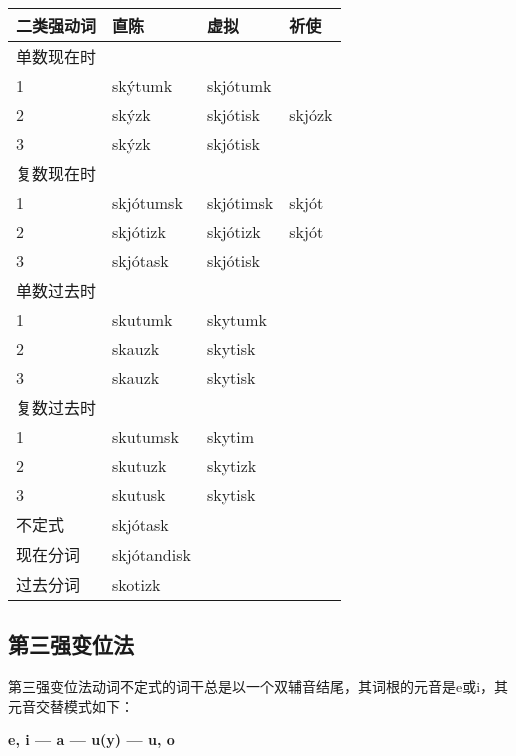 \begin{longtable}{llll}
    \toprule
    二类强动词 & 直陈        & 虚拟      & 祈使   \\
    \midrule
    \endhead
    \bottomrule
    \endfoot
    单数现在时 &             &           &        \\
    1          & skýtumk     & skjótumk  &        \\
    2          & skýzk       & skjótisk  & skjózk \\
    3          & skýzk       & skjótisk  &        \\
    复数现在时 &             &           &        \\
    1          & skjótumsk   & skjótimsk & skjót  \\
    2          & skjótizk    & skjótizk  & skjót  \\
    3          & skjótask    & skjótisk  &        \\
    单数过去时 &             &           &        \\
    1          & skutumk     & skytumk   &        \\
    2          & skauzk      & skytisk   &        \\
    3          & skauzk      & skytisk   &        \\
    复数过去时 &             &           &        \\
    1          & skutumsk    & skytim    &        \\
    2          & skutuzk     & skytizk   &        \\
    3          & skutusk     & skytisk   &        \\
    不定式     & skjótask    &           &        \\
    现在分词   & skjótandisk &           &        \\
    过去分词   & skotizk     &           &        \\
\end{longtable}

\subsection{第三强变位法}\label{第三强变位法}

第三强变位法动词不定式的词干总是以一个双辅音结尾，其词根的元音是e或i，其元音交替模式如下：

\begin{center}
    \textbf{e, i --- a --- u(y) --- u, o}
\end{center}


